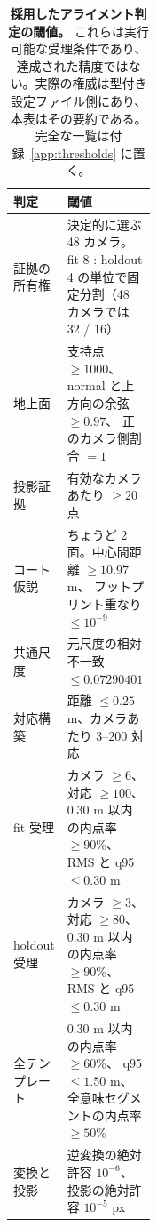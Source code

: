 \begin{table}[t]
  \centering
  \caption{\textbf{採用したアライメント判定の閾値。}
  これらは実行可能な受理条件であり、
  達成された精度ではない。実際の権威は型付き設定ファイル側にあり、
  本表はその要約である。
  完全な一覧は付録~\ref{app:thresholds} に置く。
  }
  \label{tab:alignment_gates}
  \small
  \begin{tabularx}{\linewidth}{@{}p{0.32\linewidth}X@{}}
    \toprule
    判定 & 閾値 \\
    \midrule
    証拠の所有権 & 決定的に選ぶ 48 カメラ。
      fit 8 : holdout 4 の単位で固定分割（48 カメラでは 32 / 16） \\
    地上面 & 支持点 \(\geq 1000\)、
      normal と上方向の余弦 \(\geq 0.97\)、
      正のカメラ側割合 \(=1\) \\
    投影証拠 & 有効なカメラあたり \(\geq 20\) 点 \\
    コート仮説 & ちょうど 2 面。中心間距離 \(\geq 10.97\) m、
      フットプリント重なり \(\leq 10^{-9}\) \\
    共通尺度 & 元尺度の相対不一致 \(\leq 0.07290401\) \\
    対応構築 & 距離 \(\leq 0.25\) m、カメラあたり 3--200 対応 \\
    fit 受理 & カメラ \(\geq 6\)、対応 \(\geq 100\)、
      0.30 m 以内の内点率 \(\geq 90\%\)、RMS と q95 \(\leq 0.30\) m \\
    holdout 受理 & カメラ \(\geq 3\)、対応 \(\geq 80\)、
      0.30 m 以内の内点率 \(\geq 90\%\)、RMS と q95 \(\leq 0.30\) m \\
    全テンプレート & 0.30 m 以内の内点率 \(\geq 60\%\)、
      q95 \(\leq 1.50\) m、全意味セグメントの内点率 \(\geq 50\%\) \\
    変換と投影 & 逆変換の絶対許容 \(10^{-6}\)、
      投影の絶対許容 \(10^{-5}\) px \\
    \bottomrule
  \end{tabularx}
\end{table}
